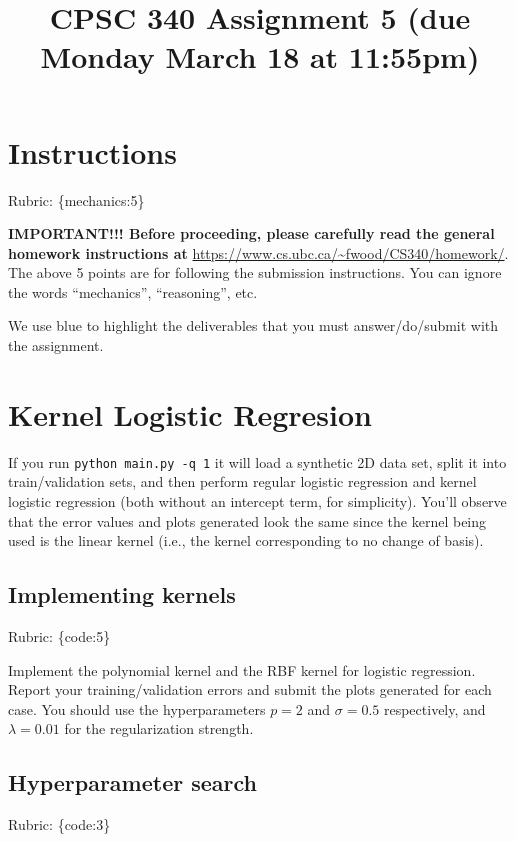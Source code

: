 \documentclass{article}
\def\rubric#1{\gre{Rubric: \{#1\}}}{}
\def\blu#1{{\color{blu}#1}}
\def\gre#1{{\color{gre}#1}}
\begin{document}
\title{CPSC 340 Assignment 5 (due Monday March 18 at 11:55pm)}
\date{}
\maketitle

\vspace{-7em}


\section*{Instructions}
\rubric{mechanics:5}

\textbf{IMPORTANT!!! Before proceeding, please carefully read the general homework instructions at} \url{https://www.cs.ubc.ca/~fwood/CS340/homework/}. The above 5 points are for following the submission instructions. You can ignore the words ``mechanics'', ``reasoning'', etc.

\vspace{1em}
We use \blu{blue} to highlight the deliverables that you must answer/do/submit with the assignment.


\section{Kernel Logistic Regresion}

If you run \verb|python main.py -q 1| it will load a synthetic 2D data set, split it into train/validation sets, and then perform regular logistic regression and kernel logistic regression (both without an intercept term, for simplicity). You'll observe that the error values and plots generated look the same since the kernel being used is the linear kernel (i.e., the kernel corresponding to no change of basis).

\subsection{Implementing kernels}
\rubric{code:5}

 \blu{Implement the polynomial kernel and the RBF kernel for logistic regression. Report your training/validation errors and submit the plots generated for each case}. You should use the hyperparameters $p=2$ and $\sigma=0.5$ respectively, and $\lambda=0.01$ for the regularization strength.



\subsection{Hyperparameter search}
\rubric{code:3}
\end{document}
